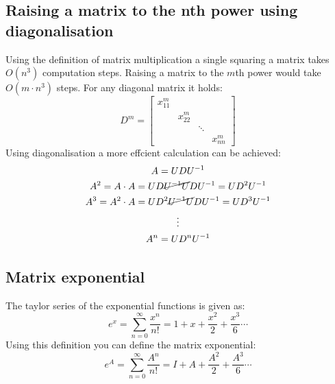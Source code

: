 \begin{example}
    \subsection{Raising a matrix to the nth power using diagonalisation}
    Using the definition of matrix multiplication a single squaring a matrix takes \(O(n^3)\) computation steps. Raising a matrix to the \(m\)th power would take \(O(m \cdot n^3)\) steps.
    For any diagonal matrix it holds:
    \begin{equation}
        D^{m} = \begin{bmatrix}
            x_{11}^{m} &            &        &            \\
                       & x_{22}^{m} &        &            \\
                       &            & \ddots &            \\
                       &            &        & x_{nn}^{m}
        \end{bmatrix}
    \end{equation}
    Using diagonalisation a more effcient calculation can be achieved:
    \begin{gather*}
        A = UDU^{-1} \\
        A^2 = A \cdot A =  UD \cancel{U^{-1}  U} DU^{-1} = UD^2U^{-1} \\
        A^3 = A^2 \cdot A = UD^2 \cancel{U^{-1} U} D U^{-1} = U D^3 U^{-1}  \\
        \vdots \\
        A^{n} = U D^n U^{-1}
    \end{gather*}
\end{example}
\subsection{Matrix exponential}\label{sec:matrixexponent}
The taylor series of the exponential functions is given as:
\begin{equation}
    e^{x} = \sum_{n=0}^{\infty} \frac{x^n}{n!} = 1 + x + \frac{x^2}{2} + \frac{x^3}{6} \cdots
\end{equation}
Using this definition you can define the matrix exponential:
\begin{equation}
    e^{A} = \sum_{n=0}^{\infty} \frac{A^n}{n!} = I + A + \frac{A^2}{2} + \frac{A^3}{6} \cdots
\end{equation}
